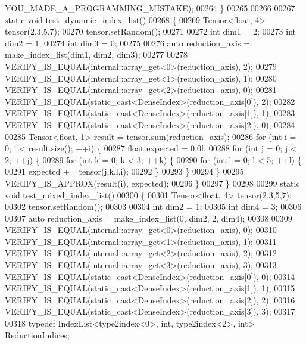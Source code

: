 \begin{DoxyCode}
      YOU\_MADE\_A\_PROGRAMMING\_MISTAKE);
00264 \}
00265 
00266 
00267 \textcolor{keyword}{static} \textcolor{keywordtype}{void} test\_dynamic\_index\_list()
00268 \{
00269   Tensor<float, 4> tensor(2,3,5,7);
00270   tensor.setRandom();
00271 
00272   \textcolor{keywordtype}{int} dim1 = 2;
00273   \textcolor{keywordtype}{int} dim2 = 1;
00274   \textcolor{keywordtype}{int} dim3 = 0;
00275 
00276   \textcolor{keyword}{auto} reduction\_axis = make\_index\_list(dim1, dim2, dim3);
00277 
00278   VERIFY\_IS\_EQUAL(internal::array\_get<0>(reduction\_axis), 2);
00279   VERIFY\_IS\_EQUAL(internal::array\_get<1>(reduction\_axis), 1);
00280   VERIFY\_IS\_EQUAL(internal::array\_get<2>(reduction\_axis), 0);
00281   VERIFY\_IS\_EQUAL(static\_cast<DenseIndex>(reduction\_axis[0]), 2);
00282   VERIFY\_IS\_EQUAL(static\_cast<DenseIndex>(reduction\_axis[1]), 1);
00283   VERIFY\_IS\_EQUAL(static\_cast<DenseIndex>(reduction\_axis[2]), 0);
00284 
00285   Tensor<float, 1> result = tensor.sum(reduction\_axis);
00286   \textcolor{keywordflow}{for} (\textcolor{keywordtype}{int} i = 0; i < result.size(); ++i) \{
00287     \textcolor{keywordtype}{float} expected = 0.0f;
00288     \textcolor{keywordflow}{for} (\textcolor{keywordtype}{int} j = 0; j < 2; ++j) \{
00289       \textcolor{keywordflow}{for} (\textcolor{keywordtype}{int} k = 0; k < 3; ++k) \{
00290         \textcolor{keywordflow}{for} (\textcolor{keywordtype}{int} l = 0; l < 5; ++l) \{
00291           expected += tensor(j,k,l,i);
00292         \}
00293       \}
00294     \}
00295     VERIFY\_IS\_APPROX(result(i), expected);
00296   \}
00297 \}
00298 
00299 \textcolor{keyword}{static} \textcolor{keywordtype}{void} test\_mixed\_index\_list()
00300 \{
00301   Tensor<float, 4> tensor(2,3,5,7);
00302   tensor.setRandom();
00303 
00304   \textcolor{keywordtype}{int} dim2 = 1;
00305   \textcolor{keywordtype}{int} dim4 = 3;
00306 
00307   \textcolor{keyword}{auto} reduction\_axis = make\_index\_list(0, dim2, 2, dim4);
00308 
00309   VERIFY\_IS\_EQUAL(internal::array\_get<0>(reduction\_axis), 0);
00310   VERIFY\_IS\_EQUAL(internal::array\_get<1>(reduction\_axis), 1);
00311   VERIFY\_IS\_EQUAL(internal::array\_get<2>(reduction\_axis), 2);
00312   VERIFY\_IS\_EQUAL(internal::array\_get<3>(reduction\_axis), 3);
00313   VERIFY\_IS\_EQUAL(static\_cast<DenseIndex>(reduction\_axis[0]), 0);
00314   VERIFY\_IS\_EQUAL(static\_cast<DenseIndex>(reduction\_axis[1]), 1);
00315   VERIFY\_IS\_EQUAL(static\_cast<DenseIndex>(reduction\_axis[2]), 2);
00316   VERIFY\_IS\_EQUAL(static\_cast<DenseIndex>(reduction\_axis[3]), 3);
00317 
00318   \textcolor{keyword}{typedef} IndexList<type2index<0>, int, type2index<2>, \textcolor{keywordtype}{int}> ReductionIndices;

\end{DoxyCode}
